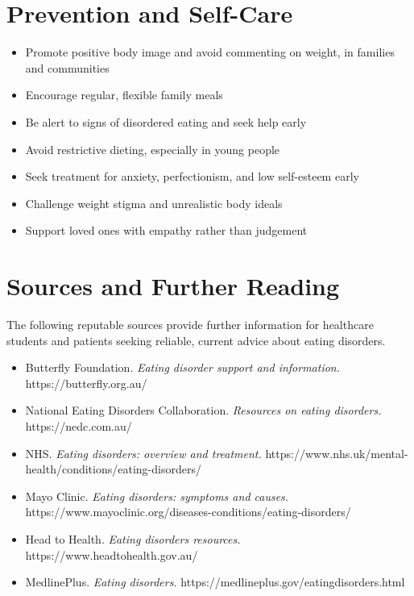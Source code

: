 \section*{Prevention and Self-Care}
\begin{itemize}
    \item Promote positive body image and avoid commenting on weight, in families and communities
    \item Encourage regular, flexible family meals
    \item Be alert to signs of disordered eating and seek help early
    \item Avoid restrictive dieting, especially in young people
    \item Seek treatment for anxiety, perfectionism, and low self-esteem early
    \item Challenge weight stigma and unrealistic body ideals
    \item Support loved ones with empathy rather than judgement
\end{itemize}

\section*{Sources and Further Reading}
The following reputable sources provide further information for healthcare students and patients seeking reliable, current advice about eating disorders.
\begin{itemize}
    \item Butterfly Foundation. \textit{Eating disorder support and information.} https://butterfly.org.au/
    \item National Eating Disorders Collaboration. \textit{Resources on eating disorders.} https://nedc.com.au/
    \item NHS. \textit{Eating disorders: overview and treatment.} https://www.nhs.uk/mental-health/conditions/eating-disorders/
    \item Mayo Clinic. \textit{Eating disorders: symptoms and causes.} https://www.mayoclinic.org/diseases-conditions/eating-disorders/
    \item Head to Health. \textit{Eating disorders resources.} https://www.headtohealth.gov.au/
    \item MedlinePlus. \textit{Eating disorders.} https://medlineplus.gov/eatingdisorders.html
\end{itemize}

